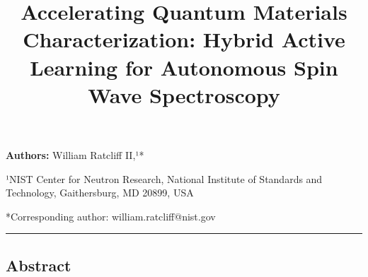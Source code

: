 \documentclass[
]{article}
\title{Accelerating Quantum Materials Characterization: Hybrid Active
Learning for Autonomous Spin Wave Spectroscopy}
\author{}
\date{}
\begin{document}
\maketitle

\textbf{Authors:} William Ratcliff II,¹*

¹NIST Center for Neutron Research, National Institute of Standards and
Technology, Gaithersburg, MD 20899, USA

*Corresponding author: william.ratcliff@nist.gov

\begin{center}\rule{0.5\linewidth}{0.5pt}\end{center}

\hypertarget{abstract}{%
\subsection{Abstract}\label{abstract}}
\end{document}
